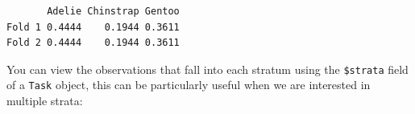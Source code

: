 \begin{Shaded}
\begin{Highlighting}[]
\OtherTok{=} \NormalTok{(}\NormalTok{)}
\SpecialCharTok{$}\NormalTok{(}\NormalTok{, }\NormalTok{(}\NormalTok{, }\NormalTok{))}
\SpecialCharTok{$}

\OtherTok{=} \NormalTok{(}\SpecialCharTok{$}\NormalTok{(}\SpecialCharTok{$}\NormalTok{(}\NormalTok{),}
   \NormalTok{)))}
\OtherTok{=} \NormalTok{(}\SpecialCharTok{$}\NormalTok{(}\SpecialCharTok{$}\NormalTok{(}\NormalTok{),}
   \NormalTok{)))}

\NormalTok{(} \OtherTok{=} \OtherTok{=}
\end{Highlighting}
\end{Shaded}

\begin{verbatim}
       Adelie Chinstrap Gentoo
Fold 1 0.4444    0.1944 0.3611
Fold 2 0.4444    0.1944 0.3611
\end{verbatim}

You can view the observations that fall into each stratum using the
\texttt{\$strata} field of a \texttt{Task} object, this can be
particularly useful when we are interested in multiple strata:

\begin{Shaded}
\begin{Highlighting}[]
\SpecialCharTok{$}\NormalTok{(}\NormalTok{, }\NormalTok{)}
\SpecialCharTok{$}
\end{Highlighting}
\end{Shaded}

